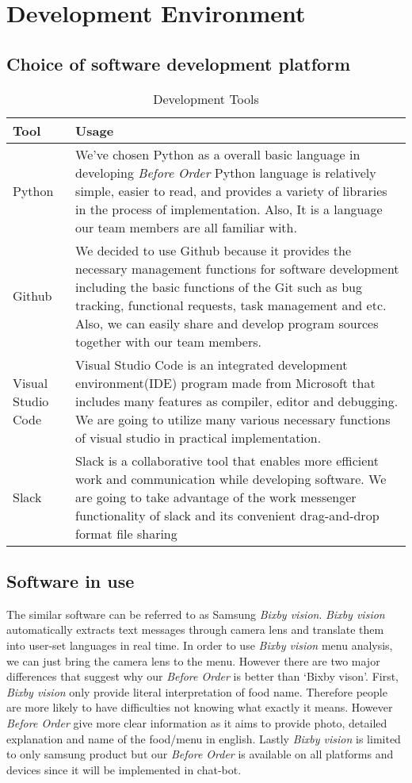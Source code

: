 \section{Development Environment}
\subsection{Choice of software development platform}
\begin{table}[htb]
\caption{Development Tools}
\begin{tabularx}{\linewidth}{|X|X|}
\toprule
Tool & Usage \\
\midrule
Python & We’ve chosen Python as a overall basic language in developing \emph{Before Order} Python language is relatively simple, easier to read, and provides a variety of libraries in the process of implementation. Also, It is a language our team members are all familiar with.\\
Github	& We decided to use Github because it provides the necessary management functions for software development including the basic functions of the Git such as bug tracking, functional requests, task management and etc. Also, we can easily share and develop program sources together with our team members.\\
Visual Studio Code & Visual Studio Code is an integrated development environment(IDE) program made from Microsoft that includes many features as compiler, editor and debugging. We are going to utilize many various necessary functions of visual studio in practical implementation.\\
Slack & Slack is a collaborative tool that enables more efficient work and communication while developing software. We are going to take advantage of the work messenger functionality of slack and its convenient drag-and-drop format file sharing
\end{tabularx}
\end{table}
\FloatBarrier

\subsection{Software in use}
The similar software can be referred to as Samsung \emph{Bixby vision}. \emph{Bixby vision} automatically extracts text messages through camera lens and translate them into user-set languages in real time. In order to use \emph{Bixby vision} menu analysis, we can just bring the camera lens to the menu. However there are two major differences that suggest why our \emph{Before Order} is better than ‘Bixby vison’. First, \emph{Bixby vision} only provide literal interpretation of food name. Therefore people are more likely to have difficulties not knowing what exactly it means. However \emph{Before Order} give more clear information as it aims to provide photo, detailed explanation and name of the food/menu in english. Lastly \emph{Bixby vision} is limited to only samsung product but our \emph{Before Order} is available on all platforms and devices since it will be implemented in chat-bot.

